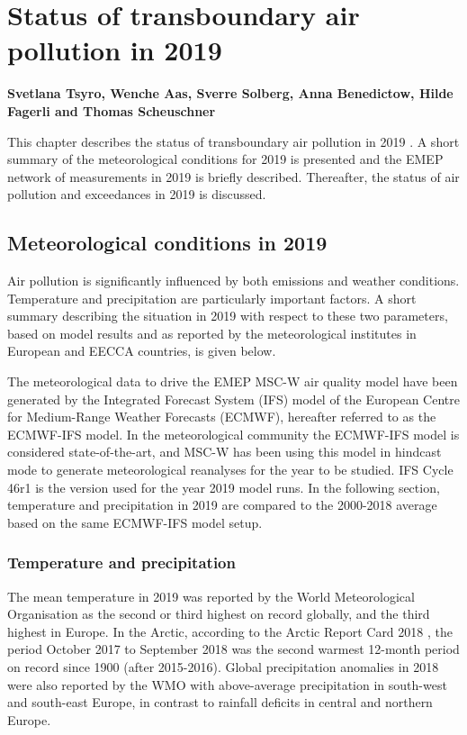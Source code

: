 \chapter[Status in 2019]{Status of transboundary air pollution in 2019}
\label{ch:chapterStatus}


{\bf{Svetlana Tsyro, Wenche Aas, Sverre Solberg, Anna Benedictow, Hilde Fagerli and Thomas Scheuschner}}
\vspace{30pt}

This chapter describes the status of transboundary air pollution in 2019 . A short summary of the meteorological conditions for 2019 is presented and the EMEP network of measurements in 2019 is briefly described. Thereafter, the status of air pollution and exceedances in 2019 is discussed.

\section{Meteorological conditions in 2019}
\label{sec:meteo}
Air pollution is significantly influenced by both emissions and weather conditions. Temperature and precipitation are particularly important factors. A short summary describing the situation in 2019 with respect to these two parameters, based on model results and as reported by the meteorological institutes in European and EECCA countries, is given below.

The meteorological data to drive the EMEP MSC-W air quality model have been generated by the Integrated Forecast System (IFS) model of the European Centre for Medium-Range Weather Forecasts (ECMWF), hereafter referred to as the ECMWF-IFS model. In the meteorological community the ECMWF-IFS model is considered state-of-the-art, and MSC-W has been using this model in hindcast mode to generate meteorological reanalyses for the year to be studied. IFS Cycle 46r1 is the version used for the year 2019 model runs. In the following section, temperature and precipitation in 2019 are compared to the 2000-2018 average based on the same ECMWF-IFS model setup.

\subsection{Temperature and precipitation}
The mean temperature in 2019 was reported by the World Meteorological Organisation \citep{WMO1248:2020} as the second or third highest on record globally, and the third highest in Europe. In the Arctic, according to the Arctic Report Card 2018 \citep{Overland:ARC2018}, the period October 2017 to September 2018 was the second warmest 12-month period on record since 1900 (after 2015-2016).
Global precipitation anomalies in 2018 were also reported by the WMO \citep{WMO1233:2018} with above-average precipitation in south-west and south-east Europe, in contrast to rainfall deficits in central and northern Europe. 

